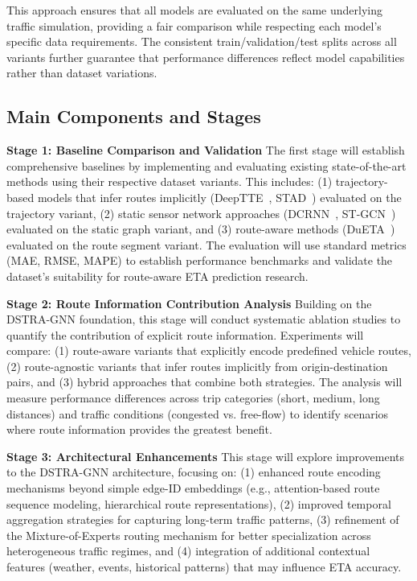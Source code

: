 This approach ensures that all models are evaluated on the same underlying traffic simulation, providing a fair comparison while respecting each model's specific data requirements. The consistent train/validation/test splits across all variants further guarantee that performance differences reflect model capabilities rather than dataset variations.

\subsection{Main Components and Stages}

\textbf{Stage 1: Baseline Comparison and Validation}
The first stage will establish comprehensive baselines by implementing and evaluating existing state-of-the-art methods using their respective dataset variants. This includes: (1) trajectory-based models that infer routes implicitly (DeepTTE~\cite{deepTTE2018}, STAD~\cite{abbar2020stad}) evaluated on the trajectory variant, (2) static sensor network approaches (DCRNN~\cite{dcrnn2018}, ST-GCN~\cite{yu2018stgcn}) evaluated on the static graph variant, and (3) route-aware methods (DuETA~\cite{dueta2023}) evaluated on the route segment variant. The evaluation will use standard metrics (MAE, RMSE, MAPE) to establish performance benchmarks and validate the dataset's suitability for route-aware ETA prediction research.

\textbf{Stage 2: Route Information Contribution Analysis}
Building on the DSTRA-GNN foundation, this stage will conduct systematic ablation studies to quantify the contribution of explicit route information. Experiments will compare: (1) route-aware variants that explicitly encode predefined vehicle routes, (2) route-agnostic variants that infer routes implicitly from origin-destination pairs, and (3) hybrid approaches that combine both strategies. The analysis will measure performance differences across trip categories (short, medium, long distances) and traffic conditions (congested vs. free-flow) to identify scenarios where route information provides the greatest benefit.

\textbf{Stage 3: Architectural Enhancements}
This stage will explore improvements to the DSTRA-GNN architecture, focusing on: (1) enhanced route encoding mechanisms beyond simple edge-ID embeddings (e.g., attention-based route sequence modeling, hierarchical route representations), (2) improved temporal aggregation strategies for capturing long-term traffic patterns, (3) refinement of the Mixture-of-Experts routing mechanism for better specialization across heterogeneous traffic regimes, and (4) integration of additional contextual features (weather, events, historical patterns) that may influence ETA accuracy.

